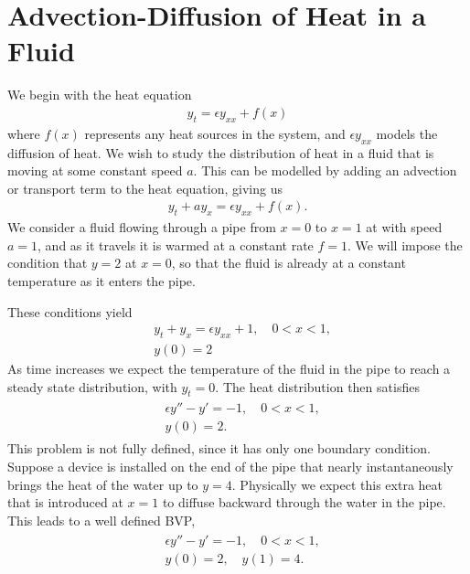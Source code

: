 \label{lab:finite_element}


\section*{Advection-Diffusion of Heat in a Fluid}

We begin with the heat equation
\begin{align*}
y_t = \epsilon y_{xx} + f(x) %
\end{align*}
where $f(x)$ represents any heat sources in the system, and $\epsilon y_{xx}$ models the diffusion of heat.
We wish to study the distribution of heat in a fluid that is moving at some constant speed $a$.
This can be modelled by adding an advection or transport term to the heat equation, giving us
\begin{align*}
y_t + ay_x = \epsilon y_{xx} + f(x).
\end{align*}
We consider a fluid flowing through a pipe from $x = 0$ to $x = 1$ at with  speed $a = 1$, and as it travels it is warmed at a constant rate $f= 1$.
We will impose the condition that $y = 2$ at $x = 0$, so that the fluid is already at a constant temperature as it enters the pipe. 

These conditions yield 
\begin{align*}
	&{ } y_t + y_x = \epsilon y_{xx} + 1, \quad 0 < x < 1, \\
	&{ } y(0) = 2
\end{align*}
As time increases we expect the temperature of the fluid in the pipe to reach a steady state distribution, with $y_t = 0$. The heat distribution then satisfies 
\begin{align*}
\begin{split}
&{ } \epsilon y'' - y' = -1, \quad 0 < x < 1,\\
&{ } y(0) = 2.
\end{split}
\end{align*}
This problem is not fully defined, since it has only one boundary condition.
Suppose a device is installed on the end of the pipe that nearly instantaneously brings the heat of the water up to $y = 4$.
Physically we expect this extra heat that is introduced at $x = 1$ to diffuse backward through the water in the pipe. This leads to a well defined BVP, 
\begin{align}
	\begin{split}
	&{ } \epsilon y'' - y' = -1, \quad 0 < x < 1, \\
	&{ } y(0) = 2, \quad y(1) = 4.
	\end{split}\label{eqn:FEM_steady_state}
\end{align}

